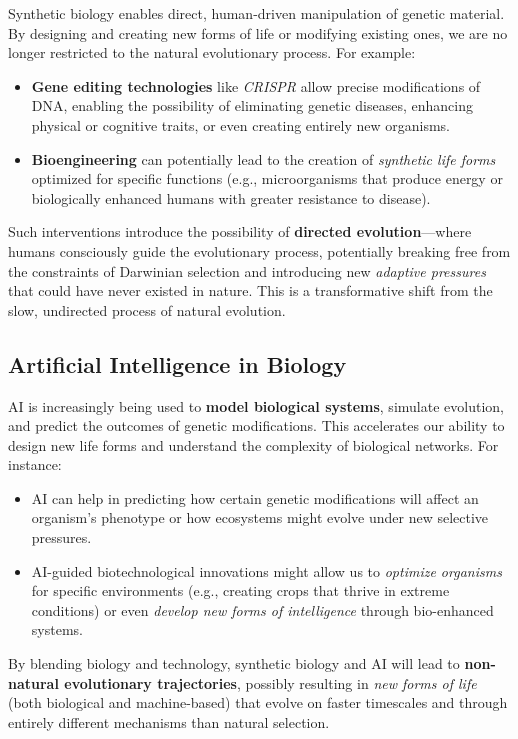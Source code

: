 \documentclass[10pt,titlepage]{book}
\begin{document}
Synthetic biology enables direct, human-driven manipulation of genetic material. By designing and creating new forms of life or modifying existing ones, we are no longer restricted to the natural evolutionary process. For example:
\begin{itemize}
    \item \textbf{Gene editing technologies} like \textit{CRISPR} allow precise modifications of DNA, enabling the possibility of eliminating genetic diseases, enhancing physical or cognitive traits, or even creating entirely new organisms.
    \item \textbf{Bioengineering} can potentially lead to the creation of \textit{synthetic life forms} optimized for specific functions (e.g., microorganisms that produce energy or biologically enhanced humans with greater resistance to disease).
\end{itemize}

Such interventions introduce the possibility of \textbf{directed evolution}—where humans consciously guide the evolutionary process, potentially breaking free from the constraints of Darwinian selection and introducing new \textit{adaptive pressures} that could have never existed in nature. This is a transformative shift from the slow, undirected process of natural evolution.

\subsection{Artificial Intelligence in Biology}

AI is increasingly being used to \textbf{model biological systems}, simulate evolution, and predict the outcomes of genetic modifications. This accelerates our ability to design new life forms and understand the complexity of biological networks. For instance:
\begin{itemize}
    \item AI can help in predicting how certain genetic modifications will affect an organism’s phenotype or how ecosystems might evolve under new selective pressures.
    \item AI-guided biotechnological innovations might allow us to \textit{optimize organisms} for specific environments (e.g., creating crops that thrive in extreme conditions) or even \textit{develop new forms of intelligence} through bio-enhanced systems.
\end{itemize}

By blending biology and technology, synthetic biology and AI will lead to \textbf{non-natural evolutionary trajectories}, possibly resulting in \textit{new forms of life} (both biological and machine-based) that evolve on faster timescales and through entirely different mechanisms than natural selection.
\end{document}
